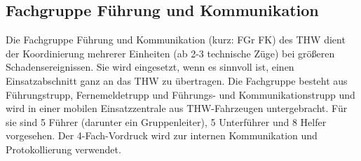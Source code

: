 \subsection{Fachgruppe Führung und Kommunikation}
Die Fachgruppe Führung und Kommunikation (kurz: FGr FK) des THW dient der Koordinierung mehrerer Einheiten (ab 2-3 technische Züge) bei größeren Schadensereignissen. Sie wird eingesetzt, wenn es sinnvoll ist, einen Einsatzabschnitt ganz an das THW zu übertragen. Die Fachgruppe  besteht aus Führungstrupp, Fernemeldetrupp und Führungs- und Kommunikationstrupp und wird in einer mobilen Einsatzzentrale aus THW-Fahrzeugen untergebracht. Für sie sind 5 Führer (darunter ein Gruppenleiter), 5 Unterführer und 8 Helfer vorgesehen. Der 4-Fach-Vordruck wird zur internen Kommunikation und Protokollierung verwendet.
